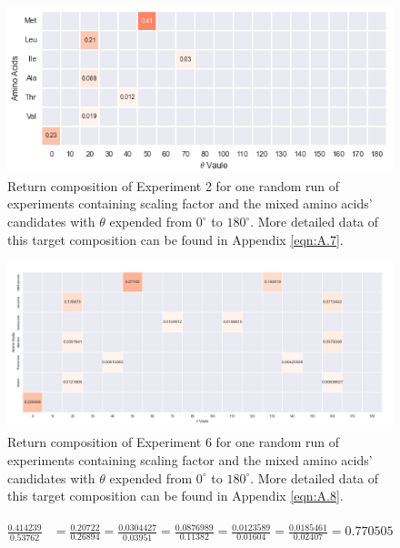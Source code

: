 \begin{figure}[!ht] 
\centering
\includegraphics[scale=0.9]{Figures/chapter6_figure_three.png}
\caption{Return composition of Experiment 2 for one random run of experiments containing scaling factor and the mixed amino acids' candidates with $\theta$ expended from $0^{\circ}$ to $180^{\circ}$. More detailed data of this target composition can be found in Appendix \ref{eqn:A.7}.} \label{fig:6.5}
\end{figure}

\begin{figure}[!ht] 
\centering
\includegraphics[scale=0.9]{Figures/chapter6_figure_four.png}
\caption{Return composition of Experiment 6 for one random run of experiments containing scaling factor and the mixed amino acids' candidates with $\theta$ expended from $0^{\circ}$ to $180^{\circ}$. More detailed data of this target composition can be found in Appendix \ref{eqn:A.8}.} \label{fig:6.6}
\end{figure}

\begin{eqnarray} 
\begin{split}
\frac{0.414239}{0.53762} &= \frac{0.20722}{0.26894} = \frac{0.0304427}{0.03951}  =\frac{0.0876989}{0.11382} = \frac{0.0123589}{0.01604} = \frac{0.0185461}{0.02407} = 0.770505
\end{split}\label{eqn:6.2}
\end{eqnarray}

